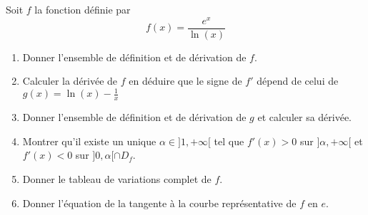 


\begin{exercice}
Soit $f$ la fonction définie par 
$$f(x)= \frac{e^{x}}{\ln(x)} $$
\begin{enumerate}
\item Donner l'ensemble de définition et de dérivation de $f$. 
\item Calculer la dérivée de $f$ en déduire que le signe de $f'$ dépend de celui de $g(x)=\ln(x) - \frac{1}{x}$
\item Donner l'ensemble de définition et de dérivation de $g$ et calculer sa dérivée. 
\item Montrer qu'il existe un unique $\alpha\in ]1,+\infty[$ tel que $f'(x)>0$ sur $]\alpha, +\infty[$ et $f'(x)<0$ sur $]0,\alpha[\cap D_f$. 
\item Donner le tableau de variations complet de $f$. 
\item Donner l'équation de la tangente à la courbe représentative de $f$ en $e$.

\end{enumerate}
\end{exercice}

